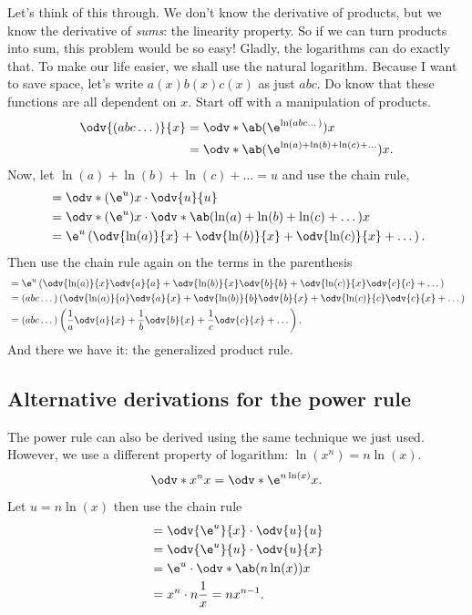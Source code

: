Let's think of this through. We don't know the derivative of products, but we know the derivative of \emph{sums}: the linearity property. So if we can turn products into sum, this problem would be so easy! Gladly, the logarithms can do exactly that. To make our life easier, we shall use the natural logarithm. Because I want to save space, let's write $a(x)b(x)c(x)$ as just $abc$. Do know that these functions are all dependent on $x$. Start off with a manipulation of products.
\begin{align*}
	\odv{(abc\dots)}{x} & = \odv*{\ab(\e^{\ln(abc\dots)})}{x}                      \\
	                    & = \odv*{\ab(\e^{\ln(a) + \ln(b) + \ln(c) + \dots})}{x}.
\end{align*}
Now, let $\ln(a) + \ln(b) + \ln(c) + \dots = u$ and use the chain rule,
\begin{align*}
	 & = \odv*{(\e^u)}{x} \cdot \odv{u}{u}                                               \\
	 & = \odv*{(\e^u)}{x} \cdot \odv*{\ab(\ln(a) + \ln(b) + \ln(c) + \dots)}{x}          \\
	 & = \e^u \left(\odv{\ln(a)}{x} + \odv{\ln(b)}{x} + \odv{\ln(c)}{x} + \dots\right).
\end{align*}
Then use the chain rule again on the terms in the parenthesis
\begin{align*}
	 & = \e^u \left(\odv{\ln(a)}{x}\odv{a}{a} + \odv{\ln(b)}{x}\odv{b}{b} + \odv{\ln(c)}{x}\odv{c}{c} + \dots\right)      \\
	 & = (abc\dots)\left(\odv{\ln(a)}{a}\odv{a}{x} + \odv{\ln(b)}{b}\odv{b}{x} + \odv{\ln(c)}{c}\odv{c}{x} + \dots\right) \\
	 & = (abc\dots)\left(\frac{1}{a}\odv{a}{x} + \frac{1}{b}\odv{b}{x} + \frac{1}{c}\odv{c}{x} + \dots\right).
\end{align*}
And there we have it: the generalized product rule.

\subsection{Alternative derivations for the power rule}

The power rule can also be derived using the same technique we just used. However, we use a different property of logarithm: $\ln(x^n) = n\ln(x)$.
\begin{equation*}
	\odv*{x^n}{x} = \odv*{\e^{n\ln(x)}}{x}.
\end{equation*}
Let $u = n\ln(x)$ then use the chain rule
\begin{align*}
	 & = \odv{\e^u}{x} \cdot \odv{u}{u}        \\
	 & = \odv{\e^u}{u} \cdot \odv{u}{x}        \\
	 & = \e^u \cdot \odv*{\ab(n\ln(x))}{x}     \\
	 & = x^n \cdot n\frac{1}{x} = nx^{n - 1}.
\end{align*}

